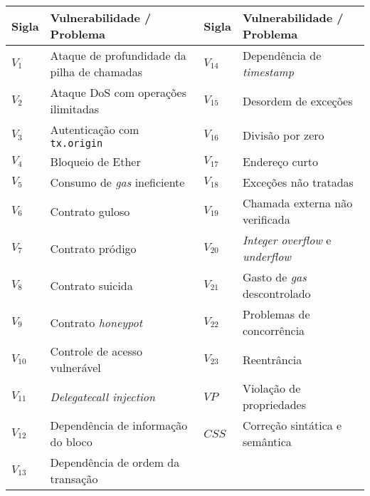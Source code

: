 \begin{table}[!ht]
\centering
\fontsize{8pt}{8pt}\selectfont
\addtolength{\tabcolsep}{-4pt}
\begin{tabular}{@{}llll@{}}
\toprule
\textbf{Sigla} & \textbf{Vulnerabilidade / Problema} & \textbf{Sigla} & \textbf{Vulnerabilidade / Problema} \\ \midrule
$V_{1}$  & Ataque de profundidade da pilha de chamadas & $V_{14}$ & Dependência de \textit{timestamp}       \\
$V_{2}$  & Ataque DoS com operações ilimitadas         & $V_{15}$ & Desordem de exceções           \\
$V_{3}$  & Autenticação com \texttt{tx.origin}                  & $V_{16}$ & Divisão por zero               \\
$V_{4}$  & Bloqueio de Ether                           & $V_{17}$ & Endereço curto                 \\
$V_{5}$  & Consumo de \textit{gas} ineficiente                  & $V_{18}$ & Exceções não tratadas          \\
$V_{6}$  & Contrato guloso                             & $V_{19}$ & Chamada externa não verificada \\
$V_{7}$  & Contrato pródigo                            & $V_{20}$ & \textit{Integer overflow} e \textit{underflow}   \\
$V_{8}$  & Contrato suicida                            & $V_{21}$ & Gasto de \textit{gas} descontrolado     \\
$V_{9}$  & Contrato \textit{honeypot}                           & $V_{22}$ & Problemas de concorrência      \\
$V_{10}$ & Controle de acesso vulnerável               & $V_{23}$ & Reentrância                    \\
$V_{11}$ & \textit{Delegatecall injection}             & $VP$  & Violação de propriedades       \\
$V_{12}$ & Dependência de informação do bloco          & $CSS$ & Correção sintática e semântica \\
$V_{13}$ & Dependência de ordem da transação           &       &                                \\ \bottomrule
\end{tabular}
\end{table}